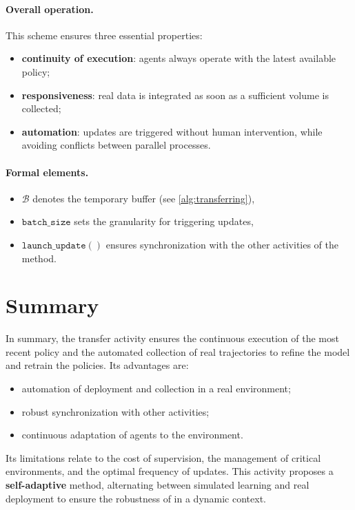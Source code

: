 \paragraph{Overall operation.}
This scheme ensures three essential properties:
\begin{itemize}
  \item \textbf{continuity of execution}: agents always operate with the latest available policy;
  \item \textbf{responsiveness}: real data is integrated as soon as a sufficient volume is collected;
  \item \textbf{automation}: updates are triggered without human intervention, while avoiding conflicts between parallel processes.
\end{itemize}

\paragraph{Formal elements.}
%
\begin{itemize}
\item $\mathcal{B}$ denotes the temporary buffer (see \autoref{alg:transferring}),
\item $\texttt{batch\_size}$ sets the granularity for triggering updates,
\item $\texttt{launch\_update}()$ ensures synchronization with the other activities of the method.
\end {itemize}


\section{Summary}

In summary, the transfer activity ensures the continuous execution of the most recent policy and the automated collection of real trajectories to refine the model and retrain the policies.
%
Its advantages are:
\begin{itemize}
  \item automation of deployment and collection in a real environment;
  \item robust synchronization with other  activities;
  \item continuous adaptation of agents to the environment.
\end{itemize}

Its limitations relate to the cost of supervision, the management of critical environments, and the optimal frequency of updates.
%
This activity proposes a \textbf{self-adaptive} method, alternating between simulated learning and real deployment to ensure the robustness of  in a dynamic context.



